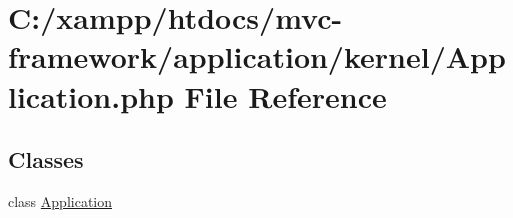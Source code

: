 \hypertarget{_application_8php}{}\section{C\+:/xampp/htdocs/mvc-\/framework/application/kernel/\+Application.php File Reference}
\label{_application_8php}
\subsection*{Classes}
\begin{DoxyCompactItemize}
\item 
class \hyperlink{class_application}{Application}
\end{DoxyCompactItemize}
